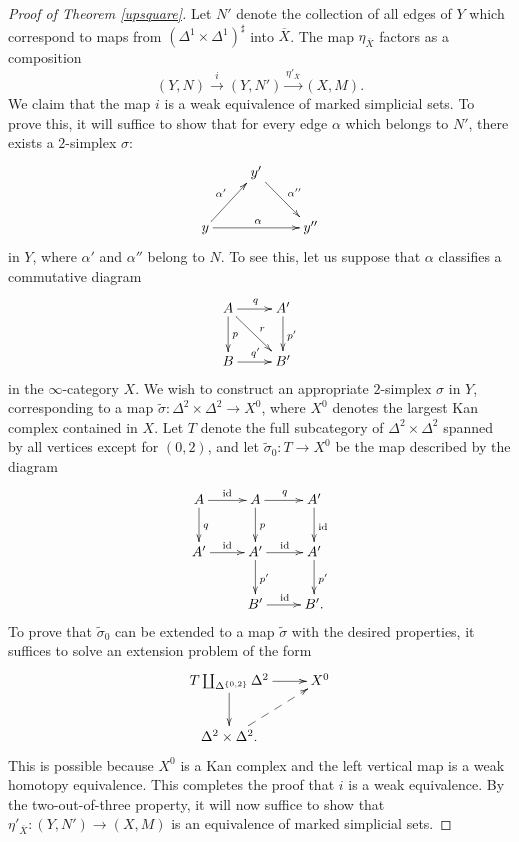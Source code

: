 \begin{proof}[Proof of Theorem \ref{upsquare}]
Let $N'$ denote the collection of all edges of $Y$ which correspond to maps from
$(\Delta^1 \times \Delta^1)^{\sharp}$ into $\overline{X}$. The map $\eta_{\overline{X}}$ factors as a composition
$$ (Y, N) \stackrel{i}{\rightarrow} (Y,N') \stackrel{ \eta'_{\overline{X}}}{\rightarrow} (X,M).$$
We claim that the map $i$ is a weak equivalence of marked simplicial sets. To prove this, it
will suffice to show that for every edge $\alpha$ which belongs to $N'$, there exists a 
$2$-simplex  $\sigma:$
$$ \xymatrix{ & y' \ar[dr]^{\alpha''} & \\
y \ar[ur]^{\alpha'} \ar[rr]^{\alpha} & & y'' }$$
in $Y$, where $\alpha'$ and $\alpha''$ belong to $N$. To see this, let us suppose that
$\alpha$ classifies a commutative diagram
$$ \xymatrix{ A \ar[d]^{p} \ar[r]^{q} \ar[dr]^{r} & A' \ar[d]^{p'} \\
B \ar[r]^{q'} & B' }$$
in the $\infty$-category $X$. We wish to construct an appropriate $2$-simplex
$\sigma$ in $Y$, corresponding to a map $\widetilde{\sigma}: \Delta^2 \times \Delta^2 \rightarrow X^0$, where $X^0$ denotes the largest Kan complex contained in $X$. Let $T$ denote the full subcategory
of $\Delta^2 \times \Delta^2$ spanned by all vertices except for $(0,2)$, and let
$\widetilde{\sigma}_0: T \rightarrow X^0$ be the map described by the diagram
$$ \xymatrix{ A \ar[r]^{\id} \ar[d]^{q} & A \ar[d]^{p} \ar[r]^{q} & A' \ar[d]^{\id} \\
A' \ar[r]^{\id} & A' \ar[r]^{\id} \ar[d]^{p'} & A' \ar[d]^{p'} \\
& B' \ar[r]^{\id} & B'. }$$
To prove that $\widetilde{\sigma}_0$ can be extended to a map $\widetilde{\sigma}$ with the desired properties, it suffices to solve an extension problem of the form
$$ \xymatrix{ T \coprod_{ \Delta^{ \{0,2\} } } \Delta^2 \ar[r] \ar[d] & X^0 \\
\Delta^2 \times \Delta^2. \ar@{-->}[ur] & }$$
This is possible because $X^0$ is a Kan complex and the left vertical map is a weak homotopy equivalence. This completes the proof that $i$ is a weak equivalence. By the two-out-of-three property, it will now suffice to show that $\eta'_{\overline{X}}: (Y,N') \rightarrow (X,M)$ is an equivalence of marked simplicial sets.


\end{proof}
